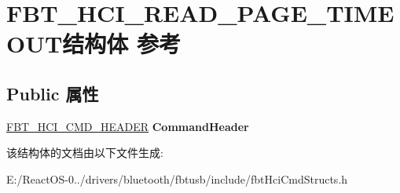 \hypertarget{struct_f_b_t___h_c_i___r_e_a_d___p_a_g_e___t_i_m_e_o_u_t}{}\section{F\+B\+T\+\_\+\+H\+C\+I\+\_\+\+R\+E\+A\+D\+\_\+\+P\+A\+G\+E\+\_\+\+T\+I\+M\+E\+O\+U\+T结构体 参考}
\label{struct_f_b_t___h_c_i___r_e_a_d___p_a_g_e___t_i_m_e_o_u_t}
\subsection*{Public 属性}
\begin{DoxyCompactItemize}
\item 
\mbox{\label{struct_f_b_t___h_c_i___r_e_a_d___p_a_g_e___t_i_m_e_o_u_t_aa941000f6df0f95871c0bd3ed5e017b0}} 
\hyperlink{struct_f_b_t___h_c_i___c_m_d___h_e_a_d_e_r}{F\+B\+T\+\_\+\+H\+C\+I\+\_\+\+C\+M\+D\+\_\+\+H\+E\+A\+D\+ER} {\bfseries Command\+Header}
\end{DoxyCompactItemize}


该结构体的文档由以下文件生成\+:\begin{DoxyCompactItemize}
\item 
E\+:/\+React\+O\+S-\/0../drivers/bluetooth/fbtusb/include/fbt\+Hci\+Cmd\+Structs.\+h\end{DoxyCompactItemize}

